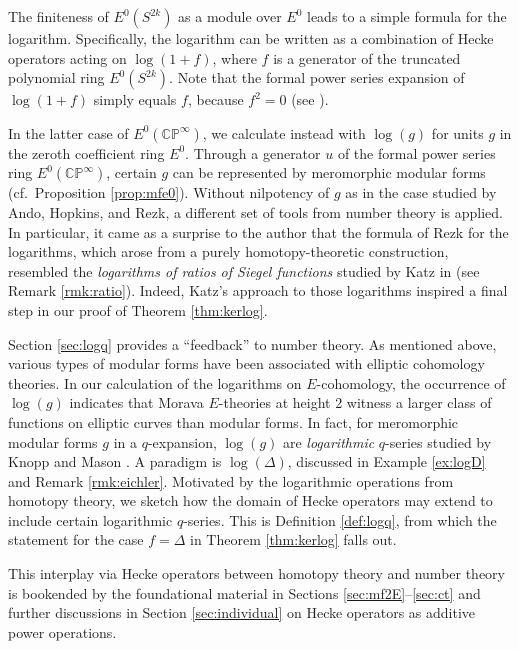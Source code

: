 \documentclass{gtpart}
\theoremstyle{definition}
\theoremstyle{remark}
\newcommand{\mb}[1]{\mathbb{#1}}
\newcommand{\BC}{{\mb C}}
\newcommand{\BP}{{\mb P}}
\renewcommand{\D}{\Delta}
\renewcommand{\=}{\approx}
\renewcommand{\-}{\sim}
\numberwithin{equation}{section}
\numberwithin{thm}{section}
\begin{document}
The finiteness of $E^0(S^{2 k})$ as a module over $E^0$ leads to a simple 
formula for the logarithm.  Specifically, the logarithm can be written as a 
combination of Hecke operators acting on $\log (1 + f)$, where $f$ is a 
generator of the truncated polynomial ring $E^0(S^{2 k})$.  Note that the formal 
power series expansion of $\log (1 + f)$ simply equals $f$, because $f^2 = 0$ 
(see \cite[Proposition 4.8 and Example 4.9]{koandtmf}).  

In the latter case of $E^0(\BC\BP^\infty)$, we calculate instead with $\log(g)$ 
for units $g$ in the zeroth coefficient ring $E^0$.  Through a generator $u$ of 
the formal power series ring $E^0(\BC\BP^\infty)$, certain $g$ can be 
represented by meromorphic modular forms (cf.~Proposition \ref{prop:mfe0}).  
Without nilpotency of $g$ as in the case studied by Ando, Hopkins, and Rezk, a 
different set of tools from number theory is applied.  In particular, it came as 
a surprise to the author that the formula of Rezk for the logarithms, which 
arose from a purely homotopy-theoretic construction, resembled the {\em 
logarithms of ratios of Siegel functions} studied by Katz in 
\cite[Section 10.1]{padicinterp} (see Remark \ref{rmk:ratio}).  Indeed, Katz's 
approach to those logarithms inspired a final step in our proof of Theorem 
\ref{thm:kerlog}.  

Section \ref{sec:logq} provides a ``feedback'' to number theory.  As mentioned 
above, various types of modular forms have been associated with elliptic 
cohomology theories.  In our calculation of the logarithms on $E$-cohomology, 
the occurrence of $\log(g)$ indicates that Morava $E$-theories at height 2 
witness a larger class of functions on elliptic curves than modular forms.  In 
fact, for meromorphic modular forms $g$ in a $q$-expansion, $\log(g)$ are {\em 
logarithmic} $q$-series studied by Knopp and Mason \cite{KnoppMason}.  A 
paradigm is $\log(\D)$, discussed in Example \ref{ex:logD} and Remark 
\ref{rmk:eichler}.  Motivated by the logarithmic operations from homotopy 
theory, we sketch how the domain of Hecke operators may extend to include 
certain logarithmic $q$-series.  This is Definition \ref{def:logq}, from which 
the statement for the case $f = \D$ in Theorem \ref{thm:kerlog} falls out.  

This interplay via Hecke operators between homotopy theory and number theory is 
bookended by the foundational material in Sections \ref{sec:mf2E}--\ref{sec:ct} 
and further discussions in Section \ref{sec:individual} on Hecke operators as 
additive power operations.  
\end{document}
